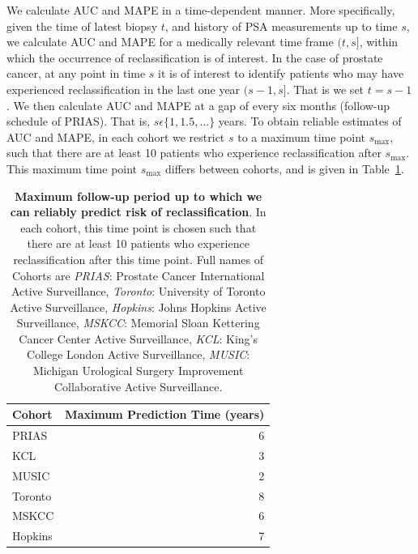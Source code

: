 We calculate AUC and MAPE in a time-dependent manner. More specifically, given the time of latest biopsy $t$, and history of PSA measurements up to time $s$, we calculate AUC and MAPE for a medically relevant time frame $(t, s]$, within which the occurrence of reclassification is of interest. In the case of prostate cancer, at any point in time $s$ it is of interest to identify patients who may have experienced reclassification in the last one year $(s-1, s]$. That is we set $t=s-1$. We then calculate AUC and MAPE at a gap of every six months (follow-up schedule of PRIAS). That is, $s \epsilon \{1, 1.5, \ldots \}$ years. To obtain reliable estimates of AUC and MAPE, in each cohort we restrict $s$ to a maximum time point $s_{\mbox{max}}$, such that there are at least 10 patients who experience reclassification after $s_{\mbox{max}}$. This maximum time point $s_{\mbox{max}}$ differs between cohorts, and is given in Table~\ref{tab:max_pred_time}.

\begin{table}[!htb]
\small\sf\centering
\caption{\textbf{Maximum follow-up period up to which we can reliably predict risk of reclassification}. In each cohort, this time point is chosen such that there are at least 10 patients who experience reclassification after this time point. Full names of Cohorts are \textit{PRIAS}: Prostate Cancer International Active Surveillance, \textit{Toronto}: University of Toronto Active Surveillance, \textit{Hopkins}: Johns Hopkins Active Surveillance, \textit{MSKCC}: Memorial Sloan Kettering Cancer Center Active Surveillance, \textit{KCL}: King's College London Active Surveillance, \textit{MUSIC}: Michigan Urological Surgery Improvement Collaborative Active Surveillance.}
\label{tab:max_pred_time}
\begin{tabular}{l|r}
\hline
\hline
Cohort & Maximum Prediction Time (years)\\ 
\hline
PRIAS & 6\\
KCL & 3\\
MUSIC & 2\\
Toronto & 8\\
MSKCC & 6\\
Hopkins & 7\\
\hline
\end{tabular}	
\end{table}

